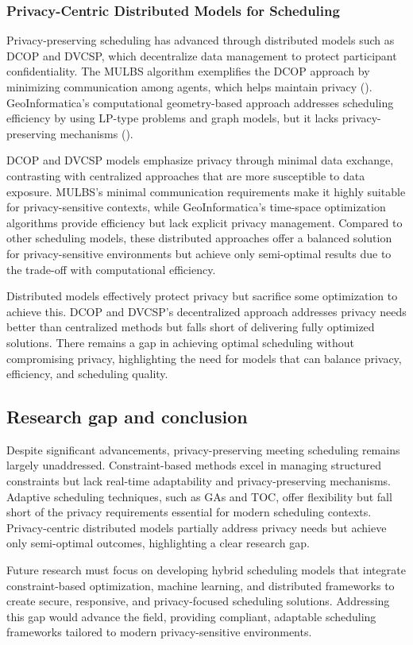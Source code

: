 \begin{spacing}{1.0}
    \subsubsection{Privacy-Centric Distributed Models for Scheduling}
    \indent \indent Privacy-preserving scheduling has advanced through distributed models such as DCOP and DVCSP, which decentralize data management to protect participant confidentiality. The MULBS algorithm exemplifies the DCOP approach by minimizing communication among agents, which helps maintain privacy (\cite{enembreck2012}). GeoInformatica’s computational geometry-based approach addresses scheduling efficiency by using LP-type problems and graph models, but it lacks privacy-preserving mechanisms (\cite{florian2009}). 
    \par DCOP and DVCSP models emphasize privacy through minimal data exchange, contrasting with centralized approaches that are more susceptible to data exposure. MULBS’s minimal communication requirements make it highly suitable for privacy-sensitive contexts, while GeoInformatica’s time-space optimization algorithms provide efficiency but lack explicit privacy management. Compared to other scheduling models, these distributed approaches offer a balanced solution for privacy-sensitive environments but achieve only semi-optimal results due to the trade-off with computational efficiency.
    \par Distributed models effectively protect privacy but sacrifice some optimization to achieve this. DCOP and DVCSP’s decentralized approach addresses privacy needs better than centralized methods but falls short of delivering fully optimized solutions. There remains a gap in achieving optimal scheduling without compromising privacy, highlighting the need for models that can balance privacy, efficiency, and scheduling quality.

    \subsection{Research gap and conclusion}
    \indent \indent Despite significant advancements, privacy-preserving meeting scheduling remains largely unaddressed. Constraint-based methods excel in managing structured constraints but lack real-time adaptability and privacy-preserving mechanisms. Adaptive scheduling techniques, such as GAs and TOC, offer flexibility but fall short of the privacy requirements essential for modern scheduling contexts. Privacy-centric distributed models partially address privacy needs but achieve only semi-optimal outcomes, highlighting a clear research gap.
    \par Future research must focus on developing hybrid scheduling models that integrate constraint-based optimization, machine learning, and distributed frameworks to create secure, responsive, and privacy-focused scheduling solutions. Addressing this gap would advance the field, providing compliant, adaptable scheduling frameworks tailored to modern privacy-sensitive environments.



\end{spacing}
